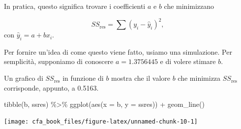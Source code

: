 \documentclass[
  11pt,
]{krantz}
\makeatletter
\newenvironment{Shaded}{\begin{snugshade}}{\end{snugshade}}
\newcommand{\AttributeTok}[1]{\textcolor[rgb]{0.61,0.61,0.61}{#1}}
\newcommand{\ConstantTok}[1]{\textcolor[rgb]{0,0,0}{#1}}
\newcommand{\ControlFlowTok}[1]{\textcolor[rgb]{0.27,0.27,0.27}{\textbf{#1}}}
\newcommand{\DecValTok}[1]{\textcolor[rgb]{0.06,0.06,0.06}{#1}}
\newcommand{\FloatTok}[1]{\textcolor[rgb]{0.06,0.06,0.06}{#1}}
\newcommand{\FunctionTok}[1]{\textcolor[rgb]{0,0,0}{#1}}
\newcommand{\NormalTok}[1]{#1}
\newcommand{\OtherTok}[1]{\textcolor[rgb]{0.37,0.37,0.37}{#1}}
\newcommand{\SpecialCharTok}[1]{\textcolor[rgb]{0,0,0}{#1}}
\newenvironment{kframe}{%
\medskip{}
\setlength{\fboxsep}{.8em}
 \def\at@end@of@kframe{}%
 \ifinner\ifhmode%
  \def\at@end@of@kframe{\end{minipage}}%
  \begin{minipage}{\columnwidth}%
 \fi\fi%
 \def\FrameCommand##1{\hskip\@totalleftmargin \hskip-\fboxsep
 \colorbox{shadecolor}{##1}\hskip-\fboxsep
     \hskip-\linewidth \hskip-\@totalleftmargin \hskip\columnwidth}%
 \MakeFramed {\advance\hsize-\width
   \@totalleftmargin\z@ \linewidth\hsize
   \@setminipage}}%
 {\par\unskip\endMakeFramed%
 \at@end@of@kframe}
\renewenvironment{Shaded}{\begin{kframe}}{\end{kframe}}
\theoremstyle{definition}
\theoremstyle{definition}
\theoremstyle{definition}
\theoremstyle{definition}
\theoremstyle{remark}
\makeatother
\begin{document}
In pratica, questo significa trovare i coefficienti \(a\) e \(b\) che minimizzano

\[
SS_{\text{res}} = \sum(y_i - \hat{y}_i)^2,
\] con \(\hat{y}_i = a + b x_i\).

Per fornire un'idea di come questo viene fatto, usiamo una simulazione. Per semplicità, supponiamo di conoscere \(a = 1.3756445\) e di volere stimare \(b\).

\begin{Shaded}
\end{Shaded}

Un grafico di \(SS_{\text{res}}\) in funzione di \(b\) mostra che il valore \(b\) che minimizza \(SS_{\text{res}}\) corrisponde, appunto, a 0.5163.

\begin{Shaded}
\begin{Highlighting}[]
\FunctionTok{tibble}\NormalTok{(b, ssres) }\SpecialCharTok{\%\textgreater{}\%}
  \FunctionTok{ggplot}\NormalTok{(}\FunctionTok{aes}\NormalTok{(}\AttributeTok{x =}\NormalTok{ b, }\AttributeTok{y =}\NormalTok{ ssres)) }\SpecialCharTok{+}
  \FunctionTok{geom\_line}\NormalTok{()}
\end{Highlighting}
\end{Shaded}

\begin{center}\texttt{[image: cfa\_book\_files/figure-latex/unnamed-chunk-10-1]} \end{center}
\end{document}
